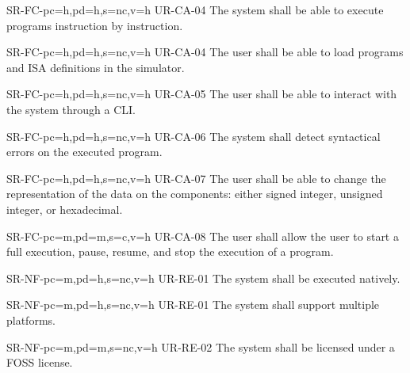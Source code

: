 \begin{softwareReq}{SR-FC-}{pc=h,pd=h,s=nc,v=h}
  {UR-CA-04}
  The system shall be able to execute programs instruction by instruction.
\end{softwareReq}

\begin{softwareReq}{SR-FC-}{pc=h,pd=h,s=nc,v=h}
  {UR-CA-04}
  The user shall be able to load programs and \gls{ISA} definitions in the simulator.
\end{softwareReq}

\begin{softwareReq}{SR-FC-}{pc=h,pd=h,s=nc,v=h}
  {UR-CA-05}
  The user shall be able to interact with the system through a \gls{CLI}.
\end{softwareReq}

\begin{softwareReq}{SR-FC-}{pc=h,pd=h,s=nc,v=h}
  {UR-CA-06}
  The system shall detect syntactical errors on the executed program.
\end{softwareReq}

\begin{softwareReq}{SR-FC-}{pc=h,pd=h,s=nc,v=h}
  {UR-CA-07}
  The user shall be able to change the representation of the data on the components: either signed integer, unsigned integer, or hexadecimal.
\end{softwareReq}

\begin{softwareReq}{SR-FC-}{pc=m,pd=m,s=c,v=h}
  {UR-CA-08}
  The user shall allow the user to start a full execution, pause, resume, and stop the execution of a program.
\end{softwareReq}


\setcounter{i}{1}

\begin{softwareReq}{SR-NF-}{pc=m,pd=h,s=nc,v=h}
  {UR-RE-01}
  The system shall be executed natively.
\end{softwareReq}

\begin{softwareReq}{SR-NF-}{pc=m,pd=h,s=nc,v=h}
  {UR-RE-01}
  The system shall support multiple platforms.
\end{softwareReq}

\begin{softwareReq}{SR-NF-}{pc=m,pd=m,s=nc,v=h}
  {UR-RE-02}
  The system shall be licensed under a \gls{FOSS} license.
\end{softwareReq}

